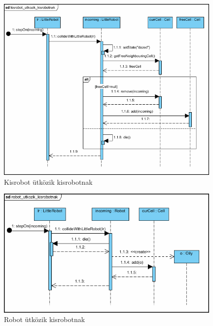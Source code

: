 \begin{figure}[h]
	\begin{center}
		\includegraphics[width=110mm]{chapters/chapter01/kisrobot_utkozik_kisrobotnak.png}
		\caption{Kisrobot ütközik kisrobotnak}
		\label{fig:SzkeletonUseCase}
	\end{center}
\end{figure}

\begin{figure}[h]
	\begin{center}
		\includegraphics[width=110mm]{chapters/chapter01/robot_utkozik_kisrobotnak.png}
		\caption{Robot ütközik kisrobotnak}
		\label{fig:SzkeletonUseCase}
	\end{center}
\end{figure}
\clearpage

